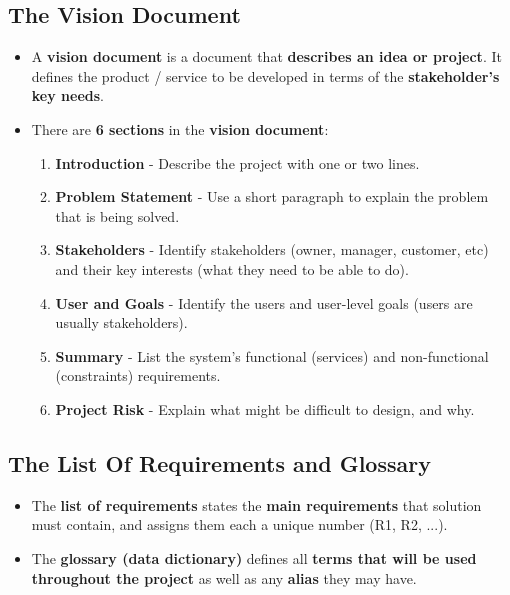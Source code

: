 \documentclass[16pt]{article}
\begin{document}
    \subsection*{The Vision Document}
    \begin{itemize}
        \item A \textbf{vision document} is a document that \textbf{describes an idea or project}. It defines the product / service to be developed in terms of the \textbf{stakeholder's key needs}.
        \item There are \textbf{6 sections} in the \textbf{vision document}:
        \begin{enumerate}
            \item \textbf{Introduction} - Describe the project with one or two lines.
            \item \textbf{Problem Statement} - Use a short paragraph to explain the problem that is being solved.
            \item \textbf{Stakeholders} - Identify stakeholders (owner, manager, customer, etc) and their key interests (what they need to be able to do).
            \item \textbf{User and Goals} - Identify the users and user-level goals (users are usually stakeholders).
            \item \textbf{Summary} - List the system's functional (services) and non-functional (constraints) requirements.
            \item \textbf{Project Risk} - Explain what might be difficult to design, and why.
        \end{enumerate}
    \end{itemize}

    \subsection*{The List Of Requirements and Glossary}
    \begin{itemize}
        \item The \textbf{list of requirements} states the \textbf{main requirements} that solution must contain, and assigns them each a unique number (R1, R2, ...).
        \item The \textbf{glossary (data dictionary)} defines all \textbf{terms that will be used throughout the project} as well as any \textbf{alias} they may have.
    \end{itemize}
\end{document}
